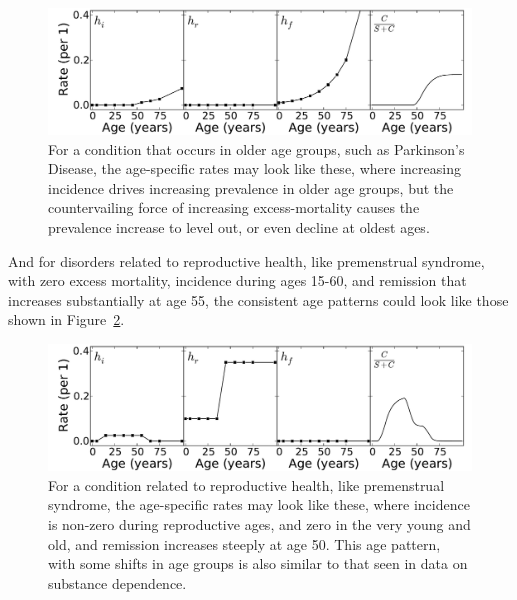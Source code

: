 \begin{figure}[h]
\begin{center}
\includegraphics[width=\textwidth]{forward-sim-old_age.pdf}
\caption{For a condition that occurs in older age groups, such as
  Parkinson's Disease, the age-specific rates may look like these,
  where increasing incidence drives increasing prevalence in older age
  groups, but the countervailing force of increasing excess-mortality
  causes the prevalence increase to level out, or even decline at
  oldest ages.}
\label{forward-sim-old-age}
\end{center}
\end{figure}

And for disorders related to reproductive health, like premenstrual
syndrome, with zero excess mortality, incidence during ages 15-60, and
remission that increases substantially at age 55, the consistent age
patterns could look like those shown in
Figure~\ref{forward-sim-reproductive}.

\begin{figure}[h]
\begin{center}
\includegraphics[width=\textwidth]{forward-sim-reproductive.pdf}
\caption{For a condition related to reproductive health, like
  premenstrual syndrome, the age-specific rates may look like these,
  where incidence is non-zero during reproductive ages, and zero in
  the very young and old, and remission increases steeply at age
  50. This age pattern, with some shifts in age groups is also similar
  to that seen in data on substance dependence.}
\label{forward-sim-reproductive}
\end{center}
\end{figure}



